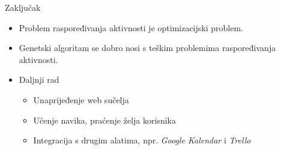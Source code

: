 \documentclass{beamer}
\begin{document}
\begin{frame}{Zaključak}
  \begin{itemize}
    \item
      Problem raspoređivanja aktivnosti je optimizacijski problem.
      
    \item
      Genetski algoritam se dobro nosi s teškim problemima raspoređivanja aktivnosti.
  \end{itemize}
  
  \begin{itemize}
    \item
      Daljnji rad
    \begin{itemize}
      \item
        Unaprijeđenje web sučelja
      \item
        Učenje navika, praćenje želja korisnika
      \item
        Integracija s drugim alatima, npr. \textit{Google Kalendar} i \textit{Trello}
    \end{itemize}
  \end{itemize}
\end{frame}
\end{document}
